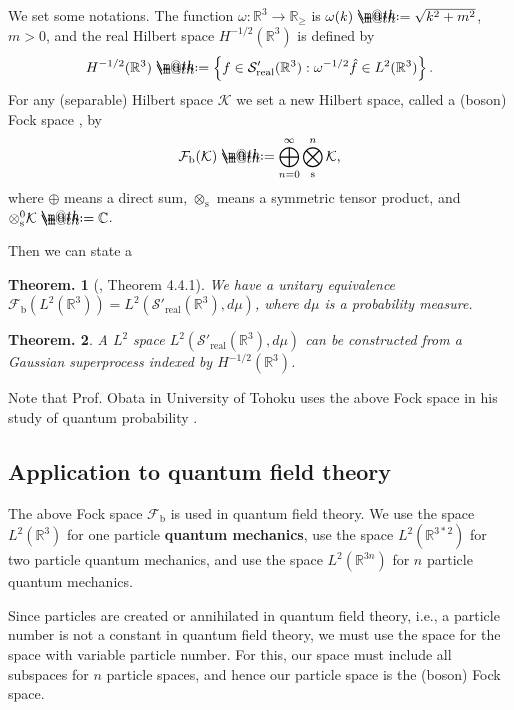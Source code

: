 \documentclass[openany, a4paper, oneside]{book}
\makeatletter
\newcommand*{\defeq}{\mathrel{\rlap{%
\raisebox{0.3ex}{$\m@th\cdot$}}%
\raisebox{-0.3ex}{$\m@th\cdot$}}%
=}
\theoremstyle{break}
\newtheorem{thm}{Theorem.}[section]
\theoremstyle{breakdefn}
\newcommand{\set}[2]{\left\{#1 : #2\right\}}
\newcommand{\calFb}{\mathcal{F}_{\mathrm{b}}}
\newcommand{\calK}{\mathcal{K}}
\newcommand{\realtempereddist}{\mathcal{S}'_{\mathrm{real}}}
\makeatother
\begin{document}
We set some notations.
The function $\omega \colon \mathbb{R}^3 \to \mathbb{R}_{\geq}$ is $\omega (k) \defeq \sqrt{k^2 + m^2}$, $m > 0$,
and the real Hilbert space $H^{-1/2} (\mathbb{R}^3)$ is defined by
\begin{align}
 H^{-1/2} (\mathbb{R}^3)
 \defeq
 \set{f \in \realtempereddist (\mathbb{R}^3)}{\omega^{-1/2} \hat{f} \in L^2 (\mathbb{R}^3)}.
\end{align}
For any (separable) Hilbert space $\calK$ we set a new Hilbert space, called a (boson) Fock space \cite{AsaoArai1, AsaoArai2}, by
\begin{align}
 \calFb (\calK)
 \defeq
 \bigoplus_{n=0}^{\infty} \bigotimes_{\mathrm{s}}^n \calK,
\end{align}
where $\oplus$ means a direct sum, $\otimes_{\mathrm{s}}$ means a symmetric tensor product,
and  $\otimes_{\mathrm{s}}^0 \calK \defeq \mathbb{C}$.

Then we can state a
\begin{thm}[\cite{AraiEzawa3}, Theorem 4.4.1]
 We have a unitary equivalence $\calFb (L^2 (\mathbb{R}^3)) = L^2 (\realtempereddist (\mathbb{R}^3), d \mu)$,
 where $d \mu$ is a probability measure.
\end{thm}
\begin{thm}
 A $L^2$ space $L^2 (\realtempereddist (\mathbb{R}^3), d \mu)$ can be constructed from a Gaussian superprocess indexed by $H^{-1/2} (\mathbb{R}^3)$.
\end{thm}

Note that Prof. Obata in University of Tohoku uses the above Fock space in his study of quantum probability \cite{AccardiObata1}.
\subsection{Application to quantum field theory \cite{AsaoArai1, AsaoArai2}}
\label{sec-8-2-1-1}

The above Fock space $\calFb$ is used in quantum field theory.
We use the space $L^2 (\mathbb{R}^3)$ for one particle \textbf{quantum mechanics},
use the space $L^2 (\mathbb{R}^{3*2})$ for two particle quantum mechanics,
and use the space $L^2 (\mathbb{R}^{3n})$ for $n$ particle quantum mechanics.

Since particles are created or annihilated in quantum field theory, i.e.,
a particle number is not a constant in quantum field theory,
we must use the space for the space with variable particle number.
For this, our space must include all subspaces for $n$ particle spaces,
and hence our particle space is the (boson) Fock space.
\end{document}
